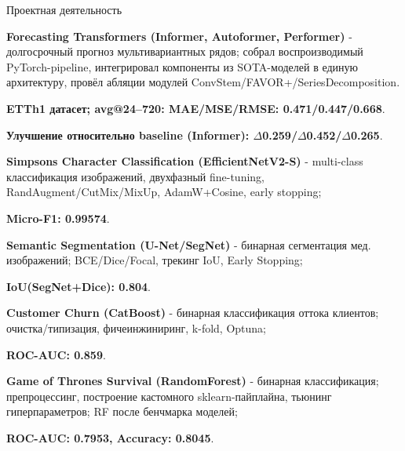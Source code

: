 \begin{rubric}{Проектная деятельность}

\entry*%

    \textbf{Forecasting Transformers (Informer, Autoformer, Performer)} - 
    долгосрочный прогноз мультивариантных рядов; собрал воспроизводимый PyTorch-pipeline, 
    интегрировал компоненты из SOTA-моделей в единую архитектуру, провёл абляции модулей 
    ConvStem/FAVOR+/SeriesDecomposition. 

    \textbf{ETTh1 датасет; avg@24--720: MAE/MSE/RMSE: 0.471/0.447/0.668}. 

    \textbf{Улучшение относительно baseline (Informer): 
    $\Delta$0.259/$\Delta$0.452/$\Delta$0.265}.


\entry*%
	\textbf{Simpsons Character Classification (EfficientNetV2-S)} - 
    multi-class классификация изображений, двухфазный fine-tuning, 
    RandAugment/CutMix/MixUp, AdamW+Cosine, early stopping; 
    
    \textbf{Micro-F1: 0.99574}.

\entry*%
	\textbf{Semantic Segmentation (U-Net/SegNet)} - 
    бинарная сегментация мед. изображений; BCE/Dice/Focal, 
    трекинг IoU, Early Stopping; 
    
    \textbf{IoU(SegNet+Dice): 0.804}.

\entry*%
	\textbf{Customer Churn (CatBoost)} - 
    бинарная классификация оттока клиентов; очистка/типизация, фичеинжиниринг, 
    k-fold, Optuna; 
    
    \textbf{ROC-AUC: 0.859}.

\entry*%
	\textbf{Game of Thrones Survival (RandomForest)} - 
    бинарная классификация; препроцессинг, построение кастомного sklearn-пайплайна,
    тьюнинг гиперпараметров; RF после бенчмарка моделей; 
    
    \textbf{ROC-AUC: 0.7953, Accuracy: 0.8045}.
\end{rubric}
